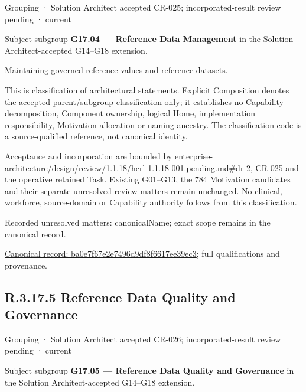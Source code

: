 \label{element:ba0e7f67e2e7496d9df8f6617ee39ec3}
{\small Grouping · Solution Architect accepted CR-025; incorporated-result review pending · current}\par

Subject subgroup \textbf{G17.04 — Reference Data Management} in the Solution Architect-accepted G14–G18 extension.



Maintaining governed reference values and reference datasets.



This is classification of architectural statements. Explicit Composition denotes the accepted parent/subgroup classification only; it establishes no Capability decomposition, Component ownership, logical Home, implementation responsibility, Motivation allocation or naming ancestry. The classification code is a source-qualified reference, not canonical identity.



Acceptance and incorporation are bounded by enterprise-architecture/design/review/1.1.18/hcrl-1.1.18-001.pending.md\#dr-2, CR-025 and the operative retained Task. Existing G01–G13, the 784 Motivation candidates and their separate unresolved review matters remain unchanged. No clinical, workforce, source-domain or Capability authority follows from this classification.


{\small Recorded unresolved matters: canonicalName; exact scope remains in the canonical record.}\par
{\footnotesize \href{../../../../continuum/grouping/ba0e7f67e2e7496d9df8f6617ee39ec3.md}{Canonical record: ba0e7f67e2e7496d9df8f6617ee39ec3}; full qualifications and provenance.}\par
\subsection*{R.3.17.5 Reference Data Quality and Governance}
\label{navigation:R.3.17.5}

\label{element:400c5c54a23a44588cc473ed10ead4a8}
{\small Grouping · Solution Architect accepted CR-026; incorporated-result review pending · current}\par

Subject subgroup \textbf{G17.05 — Reference Data Quality and Governance} in the Solution Architect-accepted G14–G18 extension.



